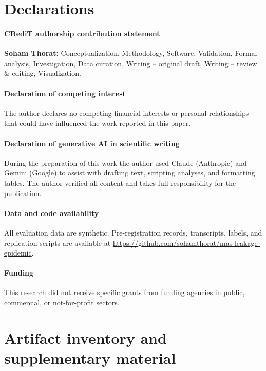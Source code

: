\documentclass[preprint,12pt,authoryear]{elsarticle}
\begin{document}
\section*{Declarations}

\paragraph{CRediT authorship contribution statement}
\textbf{Soham Thorat:} Conceptualization, Methodology, Software, Validation, Formal analysis, Investigation, Data curation, Writing -- original draft, Writing -- review \& editing, Visualization.

\paragraph{Declaration of competing interest}
The author declares no competing financial interests or personal relationships that could have influenced the work reported in this paper.

\paragraph{Declaration of generative AI in scientific writing}
During the preparation of this work the author used Claude (Anthropic) and Gemini (Google) to assist with drafting text, scripting analyses, and formatting tables. The author verified all content and takes full responsibility for the publication.

\paragraph{Data and code availability}
All evaluation data are synthetic. Pre-registration records, transcripts, labels, and replication scripts are available at \url{https://github.com/sohamthorat/mas-leakage-epidemic}.

\paragraph{Funding}
This research did not receive specific grants from funding agencies in public, commercial, or not-for-profit sectors.

\appendix

\section{Artifact inventory and supplementary material}
\label{app:supplementary}
\end{document}
